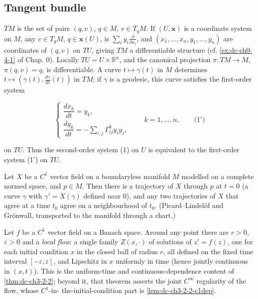 \subsection{Tangent bundle}
$TM$ is the set of pairs $(q,v)$, $q\in M$, $v\in T_qM$. If $(U,\mathbf{x})$ is a
coordinate system on $M$, any $v\in T_qM$, $q\in\mathbf{x}(U)$, is
$\sum_i y_i\frac{\partial}{\partial x_i}$, and $(x_1,\dots,x_n,y_1,\dots,y_n)$ are
coordinates of $(q,v)$ on $TU$, giving $TM$ a differentiable structure (cf.
\cref{ex:dc-ch0-4-1} of Chap. 0). Locally $TU=U\times\mathbb{R}^n$, and the canonical
projection $\pi:TM\to M$, $\pi(q,v)=q$, is differentiable. A curve $t\mapsto\gamma(t)$
in $M$ determines $t\mapsto(\gamma(t),\frac{d\gamma}{dt}(t))$ in $TM$; if $\gamma$
is a geodesic, this curve satisfies the first-order system

$$
\begin{cases}\dfrac{dx_k}{dt}=y_k,\\[4pt]\dfrac{dy_k}{dt}=-\sum_{i,j}\Gamma_{ij}^k y_i y_j,\end{cases}\qquad k=1,\dots,n,\qquad\text{(1')}
$$

on $TU$. Thus the second-order system (1) on $U$ is equivalent to the first-order
system (1') on $TU$.

\begin{lemma}
  \label{lem:dc-ch3-2-2-pointwise}


  Let $X$ be a $C^1$ vector field on a boundaryless manifold $M$ modelled on a
  complete normed space, and $p\in M$. Then there is a trajectory of $X$ through
  $p$ at $t=0$ (a curve $\gamma$ with $\gamma'=X(\gamma)$ defined near $0$), and
  any two trajectories of $X$ that agree at a time $t_0$ agree on a
  neighbourhood of $t_0$. (Picard--Lindel\"of and Gr\"onwall, transported to the
  manifold through a chart.)
\end{lemma}

\begin{lemma}
  \label{lem:dc-ch3-2-2-flow}


  Let $f$ be a $C^1$ vector field on a Banach space. Around any point there are
  $r > 0$, $\varepsilon > 0$ and a \emph{local flow}: a single family
  $Z(x, \cdot)$ of solutions of $z' = f(z)$, one for each initial condition $x$
  in the closed ball of radius $r$, all defined on the fixed time interval
  $[-\varepsilon, \varepsilon]$, and Lipschitz in $x$ uniformly in time (hence
  jointly continuous in $(x, t)$). This is the uniform-time and
  continuous-dependence content of \cref{thm:dc-ch3-2-2}; beyond it, that
  theorem asserts the joint $C^\infty$ regularity of the flow, whose $C^1$-in-%
  the-initial-condition part is \cref{lem:dc-ch3-2-2-c1dep}.
\end{lemma}

